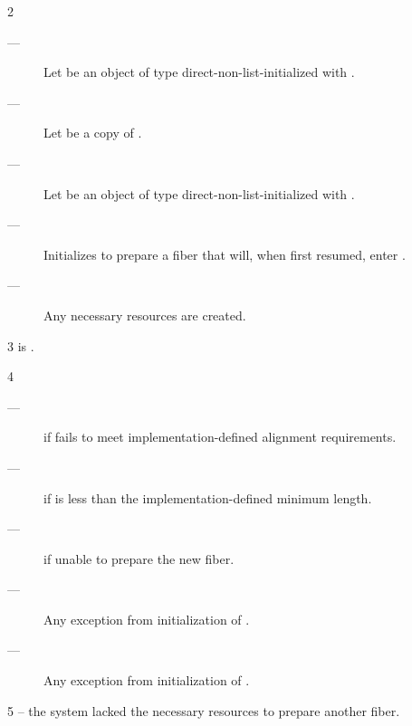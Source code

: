 2 \effects
\begin{description}
    \item[---] Let  be an object of
               type  direct-non-list-initialized
               with . 
    \item[---] Let  be a copy of .
    \item[---] Let  be an object of
               type  direct-non-list-initialized
               with . 
    \item[---] Initializes  to prepare a fiber that will, when
               first resumed, enter .
    \item[---] Any necessary resources are created.
\end{description}

3 \postcond
\emptyfn is \false.

4 \except
\begin{description}
    \item[---]  if  fails to meet
               implementation-defined alignment requirements.
    \item[---]  if  is less than the
               implementation-defined minimum length.
    \item[---]  if unable to prepare the new fiber.
    \item[---] Any exception from initialization of .
    \item[---] Any exception from initialization of .
\end{description}

5 \errors
{} -- the system lacked the necessary resources to prepare another fiber.


